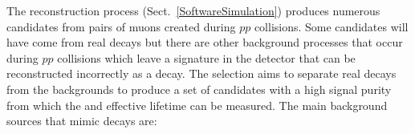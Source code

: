 
The reconstruction process (Sect.~\ref{SoftwareSimulation}) produces numerous \bmumu candidates from pairs of muons created during $pp$ collisions. Some candidates will have come from real \bmumu decays but there are other background processes that occur during $pp$ collisions which leave a signature in the detector that can be reconstructed incorrectly as a \bmumu decay. %
The selection aims to separate real \bmumu decays from the backgrounds to produce a set of \bmumu candidates with a high signal purity from which the \bmumu \BF and \bsmumu effective lifetime can be measured.
The main background sources that mimic \bmumu decays are:
